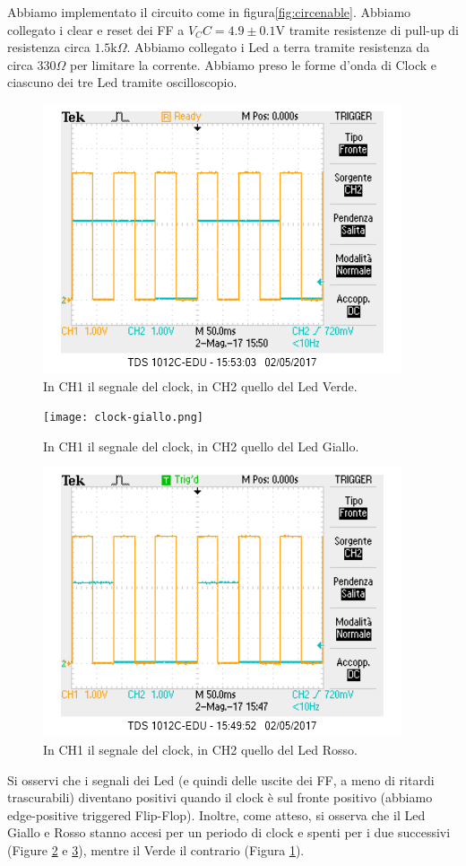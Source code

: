 \documentclass[10pt,a4paper]{article}
\begin{document}
Abbiamo implementato il circuito come in figura\ref{fig:circenable}.
Abbiamo collegato i clear e reset dei FF a $V_CC = 4.9\pm0.1 $V tramite resistenze di pull-up di resistenza circa $1.5\mbox{k}\Omega$.
Abbiamo collegato i Led a terra tramite resistenza da circa $330\Omega$ per limitare la corrente.  
Abbiamo preso le forme d'onda di Clock e ciascuno dei tre Led tramite oscilloscopio.
\begin{figure}[!htb]
\centering
\includegraphics[scale=0.7]{clock-verde.png}
\caption{In CH1 il segnale del clock, in CH2 quello del Led Verde.\label{fig:verde}}
\end{figure}

\begin{figure}[!htb]
\centering
\texttt{[image: clock-giallo.png]}
\caption{In CH1 il segnale del clock, in CH2 quello del Led Giallo.\label{fig:giallo}}
\end{figure}

\begin{figure}[!htb]
\centering
\includegraphics[scale=0.7]{clock-rosso.png}
\caption{In CH1 il segnale del clock, in CH2 quello del Led Rosso.\label{fig:rosso}}
\end{figure}
Si osservi che i segnali dei Led (e quindi delle uscite dei FF, a meno di ritardi trascurabili) diventano positivi quando il clock è sul fronte positivo (abbiamo edge-positive triggered Flip-Flop).
Inoltre, come atteso, si osserva che il Led Giallo e Rosso stanno accesi per un periodo di clock e spenti per i due successivi (Figure \ref{fig:giallo} e \ref{fig:rosso}), mentre il Verde il contrario (Figura \ref{fig:verde}).
\end{document}

